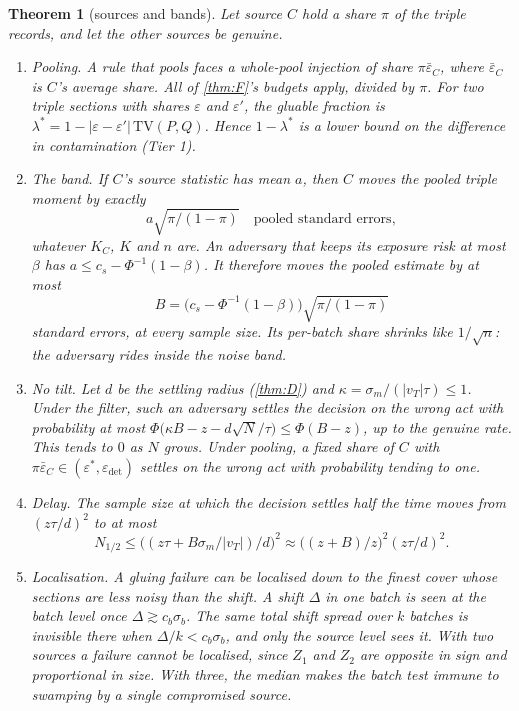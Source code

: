 \documentclass[11pt]{article}
\newtheorem{theorem}{Theorem}\renewcommand{\thetheorem}{\Alph{theorem}}
\theoremstyle{definition}\newtheorem{definition}{Definition}\newtheorem{remark}{Remark}
\begin{document}
\setcounter{theorem}{9}%
\begin{theorem}[sources and bands]\label{thm:J}
Let source $C$ hold a share $\pi$ of the triple records, and let the other sources be genuine.
\begin{enumerate}
\item[(1)] \emph{Pooling.} A rule that pools faces a whole-pool injection of share $\pi\bar\varepsilon_C$, where $\bar\varepsilon_C$ is
  $C$'s average share. All of \cref{thm:F}'s budgets apply, divided by $\pi$. For two triple sections with shares $\varepsilon$ and
  $\varepsilon'$, the gluable fraction is $\lambda^*=1-|\varepsilon-\varepsilon'|\,\mathrm{TV}(P,Q)$. Hence $1-\lambda^*$ is a lower
  bound on the difference in contamination (Tier 1).
\item[(2)] \emph{The band.} If $C$'s source statistic has mean $a$, then $C$ moves the pooled triple moment by exactly
  \[
  a\sqrt{\pi/(1-\pi)}\quad\text{pooled standard errors},
  \]
  whatever $K_C$, $K$ and $n$ are. An adversary that keeps its exposure risk at most $\beta$ has $a\le c_s-\Phi^{-1}(1-\beta)$. It therefore
  moves the pooled estimate by at most
  \[
  B=\bigl(c_s-\Phi^{-1}(1-\beta)\bigr)\sqrt{\pi/(1-\pi)}
  \]
  standard errors, \emph{at every sample size}. Its per-batch share shrinks like $1/\sqrt n$: the adversary rides inside the noise band.
\item[(3)] \emph{No tilt.} Let $d$ be the settling radius (\cref{thm:D}) and $\kappa=\sigma_m/(|v_T|\tau)\le1$. Under the filter, such
  an adversary settles the decision on the wrong act with probability at most
  $\Phi\bigl(\kappa B-z-d\sqrt N/\tau\bigr)\le\Phi(B-z)$, up to the genuine rate. This tends to $0$ as $N$ grows. Under pooling, a fixed
  share of $C$ with $\pi\bar\varepsilon_C\in(\varepsilon^*,\varepsilon_{\det})$ settles on the wrong act with probability tending to
  one.
\item[(4)] \emph{Delay.} The sample size at which the decision settles half the time moves from $(z\tau/d)^2$ to at most
  \[
  N_{1/2}\le\bigl((z\tau+B\sigma_m/|v_T|)/d\bigr)^2\approx\bigl((z+B)/z\bigr)^2(z\tau/d)^2 .
  \]
\item[(5)] \emph{Localisation.} A gluing failure can be localised down to the finest cover whose sections are less noisy than the
  shift. A shift $\Delta$ in one batch is seen at the batch level once $\Delta\gtrsim c_b\sigma_b$. The same total shift spread over $k$
  batches is invisible there when $\Delta/k<c_b\sigma_b$, and only the source level sees it. With two sources a failure cannot be
  localised, since $Z_1$ and $Z_2$ are opposite in sign and proportional in size. With three, the median makes the batch test immune to
  swamping by a single compromised source.
\end{enumerate}
\end{theorem}
\end{document}
